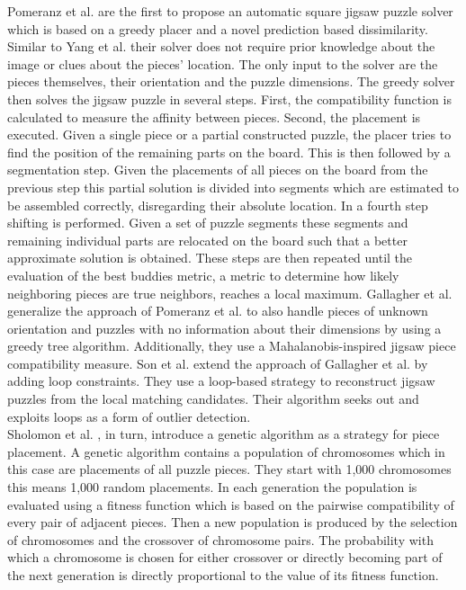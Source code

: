 \documentclass[11pt]{report}
\begin{document}
Pomeranz et al. \cite{Pomeranz2011} are the first to propose an automatic square
jigsaw puzzle solver which is based on a greedy placer and a novel prediction
based dissimilarity. Similar to Yang et al. \cite{yang2011particle} their solver
does not require prior knowledge about the image or clues about the pieces'
location. The only input to the solver are the pieces themselves, their
orientation and the puzzle dimensions. The greedy solver then solves the jigsaw
puzzle in several steps. First, the compatibility function is calculated to
measure the affinity between pieces. Second, the placement is executed. Given a
single piece or a partial constructed puzzle, the placer tries to find the
position of the remaining parts on the board. This is then followed by a
segmentation step. Given the placements of all pieces on the board from the
previous step this partial solution is divided into segments which are estimated
to be assembled correctly, disregarding their absolute location. In a fourth step
shifting is performed. Given a set of puzzle segments these segments and
remaining individual parts are relocated on the board such that a better
approximate solution is obtained. These steps are then repeated until the
evaluation of the best buddies metric, a metric to determine how likely
neighboring pieces are true neighbors, reaches a local maximum. Gallagher et al.
\cite{gallagher2012jigsaw} generalize the approach of Pomeranz et al.
\cite{Pomeranz2011} to also handle pieces of unknown orientation and puzzles
with no information about their dimensions by using a greedy tree algorithm.
Additionally, they use a Mahalanobis-inspired jigsaw piece compatibility measure.
Son et al. \cite{son2014solving} extend the approach of Gallagher et al.
\cite{gallagher2012jigsaw} by adding loop constraints. They use a loop-based
strategy to reconstruct jigsaw puzzles from the local matching candidates. Their
algorithm seeks out and exploits loops as a form of outlier detection. 
\\
Sholomon et al. \cite{sholomon2013genetic}, in turn, introduce a genetic
algorithm as a strategy for piece placement. A genetic algorithm contains a
population of chromosomes which in this case are placements of all puzzle
pieces. They start with 1,000 chromosomes this means 1,000 random placements. In
each generation the population is evaluated using a fitness function which is
based on the pairwise compatibility of every pair of adjacent pieces. Then a new
population is produced by the selection of chromosomes and the crossover of
chromosome pairs. The probability with which a chromosome is chosen for either
crossover or directly becoming part of the next generation is directly
proportional to the value of its fitness function.
\end{document}
